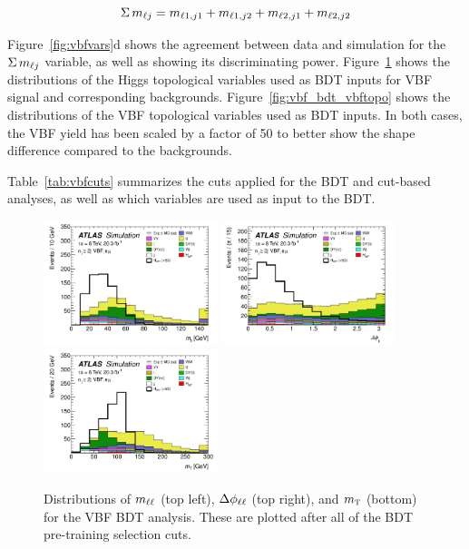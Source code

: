 \begin{equation}
\Sigma\,m_{\ell j} = m_{\ell1, j1} + m_{\ell1, j2} + m_{\ell2,j1} + m_{\ell2,j2}
\label{eqn:mlj}
\end{equation}

Figure~\ref{fig:vbfvars}d shows the agreement between data and simulation for the $\Sigma\,m_{\ell j}$ variable, as well as showing its discriminating power. Figure~\ref{fig:vbf_bdt_htopo} shows the distributions of the Higgs topological variables used as BDT inputs for VBF signal and corresponding backgrounds. Figure~\ref{fig:vbf_bdt_vbftopo} shows the distributions of the VBF topological variables used as BDT inputs. In both cases, the VBF yield has been scaled by a factor of 50 to better show the shape difference compared to the backgrounds. 

Table~\ref{tab:vbfcuts} summarizes the cuts applied for the BDT and cut-based analyses, as well as which variables are used as input to the BDT. 

\begin{figure}[h!]
  \centering
  \captionsetup{justification=centering}
  \includegraphics[width=0.45\textwidth]{figures/BDT_mll}
  \includegraphics[width=0.45\textwidth]{figures/BDT_dphill}
  \includegraphics[width=0.45\textwidth]{figures/BDT_mT}

  \caption{Distributions of $m_{\ell\ell}$ (top left), $\Delta\phi_{\ell\ell}$ (top right), and $m_{\textrm{\footnotesize\sc t}}$ (bottom) for the VBF BDT analysis. These are plotted after all of the BDT pre-training selection cuts\cite{WW2015}.}
  \label{fig:vbf_bdt_htopo}
\end{figure}

